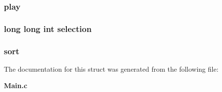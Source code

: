 \subsubsection[{play}]{ play}\label{struct_state_ab6fcaa789c458a69920029339bcb303e}
\subsubsection[{selection}]{\setlength{\rightskip}{0pt plus 5cm}long long int selection}\label{struct_state_a4aeba1b34094268f5e27ea109283bd0c}
\subsubsection[{sort}]{ sort}\label{struct_state_ade83e8c52380dc4e760633678b1e5edc}


The documentation for this struct was generated from the following file\+:\begin{DoxyCompactItemize}
\item 
{\bf Main.\+c}\end{DoxyCompactItemize}

